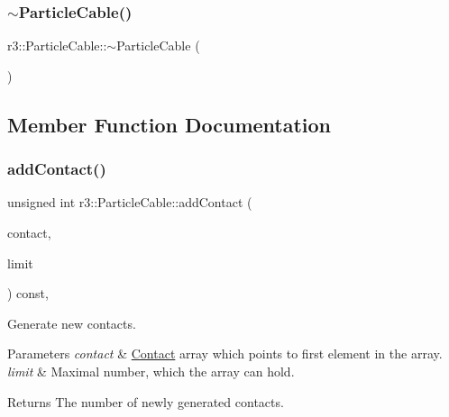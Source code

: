 \subsubsection{\texorpdfstring{$\sim$\+Particle\+Cable()}{~ParticleCable()}}
{\footnotesize\ttfamily r3\+::\+Particle\+Cable\+::$\sim$\+Particle\+Cable (\begin{DoxyParamCaption}{ }\end{DoxyParamCaption})\hspace{0.3cm}{\ttfamily [default]}}



\subsection{Member Function Documentation}
\mbox{\label{classr3_1_1_particle_cable_ac259f6edbf788c0790e6ab72f2fb6800}} 
\subsubsection{\texorpdfstring{add\+Contact()}{addContact()}}
{\footnotesize\ttfamily unsigned int r3\+::\+Particle\+Cable\+::add\+Contact (\begin{DoxyParamCaption}\item[{\mbox{\hyperlink{classr3_1_1_particle_contact}{Particle\+Contact}} $\ast$}]{contact,  }\item[{unsigned}]{limit }\end{DoxyParamCaption}) const\hspace{0.3cm}{\ttfamily [override]}, {\ttfamily [virtual]}}



Generate new contacts. 


\begin{DoxyParams}{Parameters}
{\em contact} & \mbox{\hyperlink{classr3_1_1_contact}{Contact}} array which points to first element in the array. \\
\hline
{\em limit} & Maximal number, which the array can hold. \\
\hline
\end{DoxyParams}
\begin{DoxyReturn}{Returns}
The number of newly generated contacts. 
\end{DoxyReturn}


